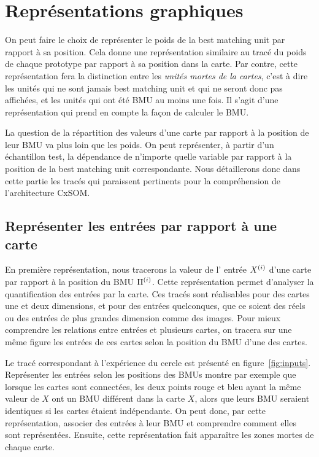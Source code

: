 \section{Représentations graphiques}

On peut faire le choix de représenter le poids de la best matching unit par rapport à sa position. Cela donne une représentation similaire au tracé du poids de chaque prototype par rapport à sa position dans la carte.  Par contre, cette représentation fera la distinction entre les \emph{unités mortes de la cartes}, c'est à dire les unités qui ne sont jamais best matching unit et qui ne seront donc pas affichées, et les unités qui ont été BMU au moins une fois. Il s'agit d'une représentation qui prend en compte la façon de calculer le BMU.

La question de la répartition des valeurs d'une carte par rapport à la position de leur BMU va plus loin que les poids. On peut représenter, à partir d'un échantillon test, la dépendance de n'importe quelle variable par rapport à la position de la best matching unit correspondante. Nous détaillerons donc dans cette partie les tracés qui paraissent pertinents pour la compréhension de l'architecture CxSOM. 

\subsection{Représenter les entrées par rapport à une carte}

En première représentation, nous tracerons la valeur de l' entrée $X^{({i})}$ d'une carte par rapport à la position du BMU $\Pi^{({i})}$. Cette représentation permet d'analyser la quantification des entrées par la carte. Ces tracés sont réalisables pour des cartes une et deux dimensions, et pour des entrées quelconques, que ce soient des réels ou des entrées de plus grandes dimension comme des images.
Pour mieux comprendre les relations entre entrées et plusieurs cartes, on tracera sur une même figure les entrées de ces cartes selon la position du BMU d'une des cartes.

Le tracé correspondant à l'expérience du cercle est présenté en figure~\ref{fig:inputs}. Représenter les entrées selon les positions des BMUs montre par exemple que lorsque les cartes sont connectées, les deux points rouge et bleu ayant la même valeur de $X$ ont un BMU différent dans la carte $X$, alors que leurs BMU seraient identiques si les cartes étaient indépendante. On peut donc, par cette représentation, associer des entrées à leur BMU et comprendre comment elles sont représentées.
Ensuite, cette représentation fait apparaître les zones mortes de chaque carte.

